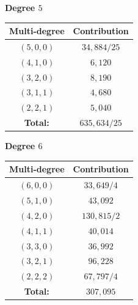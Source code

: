 \documentclass[11pt]{amsart}
\theoremstyle{definition}
\theoremstyle{definition}
\begin{document}
\begin{center}
\begin{minipage}[t]{0.4\textwidth}
\noindent \center\textbf{Degree $5$}\\
\begin{tabular}{| c | c |}
	\hline
	\textbf{Multi-degree} & \textbf{Contribution} \\
	\hline \hline
	$(5,0,0)$ & $34,\!884/25$ \\
	\hline
	$(4,1,0)$ &  $6,\!120$ \\
	\hline 
	$(3,2,0)$ &  $8,\!190$ \\
	\hline
	$(3,1,1)$ &  $4,\!680$ \\
	\hline
	$(2,2,1)$ & $5,\!040$ \\
	\hline\hline
	\textbf{Total:} & $635,\!634/25$ \\
	\hline
\end{tabular}
\noindent \center\textbf{Degree $6$}\\
\begin{tabular}{| c | c |}
	\hline
	\textbf{Multi-degree} & \textbf{Contribution} \\
	\hline \hline
	$(6,0,0)$ & $33,\!649/4$ \\
	\hline
	$(5,1,0)$ & $43,\!092$ \\
	\hline 
	$(4,2,0)$ & $130,\!815/2$ \\
	\hline
	$(4,1,1)$ & $40,\!014$  \\
	\hline
	$(3,3,0)$ & $36,\!992$ \\
	\hline
	$(3,2,1)$ & $96,\!228$ \\
	\hline
	$(2,2,2)$ & $67,\!797/4$ \\
	\hline\hline
	\textbf{Total:} & $307,\!095$ \\
	\hline
\end{tabular}
\end{minipage} \newpage


\end{center}
\end{document}
